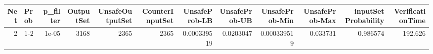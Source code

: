 \begin{tabular}{rlrrrrrrrrrr}
\hline
   Net & Prob   &   p\_filter &   OutputSet &   UnsafeOutputSet &   CounterInputSet &   UnsafeProb-LB &   UnsafeProb-UB &   UnsafeProb-Min &   UnsafeProb-Max &   inputSet Probability &   VerificationTime \\
\hline
     2 & 1-2    &      1e-05 &        3168 &              2365 &              2365 &     0.000339519 &       0.0203047 &      0.000339519 &         0.033731 &               0.986574 &            192.626 \\
\hline
\end{tabular}
